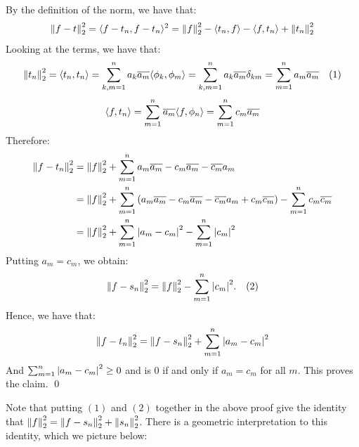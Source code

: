\begin{nproof}
    By the definition of the norm, we have that:
    \begin{align*}
        \norm{f - t}_2^2 = \langle f - t_n, f - t_n \rangle^2 = \norm{f}_2^2 - \langle t_n, f \rangle - \langle f, t_n \rangle + \norm{t_n}_2^2
    \end{align*}
    Looking at the terms, we have that:
    \begin{align*}
        \norm{t_n}_2^2 = \langle t_n, t_n \rangle = \sum_{k, m = 1}^n a_k\overline{a_m}\langle \phi_k, \phi_m \rangle = \sum_{k, m = 1}^n a_k\overline{a_m}\delta_{km} = \sum_{m=1}^n a_m\overline{a_m} \quad (1)
    \end{align*}
    \begin{align*}
        \langle f, t_n \rangle = \sum_{m=1}^n \overline{a_m}\langle f, \phi_n \rangle = \sum_{m=1}^n c_m\overline{a_m}
    \end{align*}
    Therefore:
    \begin{align*}
        \norm{f - t_n}_2^2 &= \norm{f}_2^2 + \sum_{m=1}^n a_m\overline{a_m} - c_m\overline{a_m} - \overline{c_m}a_m 
        \\ &= \norm{f}_2^2 + \sum_{m=1}^n \left(a_m\overline{a_m} - c_m\overline{a_m} - \overline{c_m}a_m + c_m\overline{c_m}\right) - \sum_{m=1}^n c_m\overline{c_m}
        \\ &= \norm{f}_2^2 + \sum_{m=1}^n \abs{a_m - c_m}^2 - \sum_{m=1}^n \abs{c_m}^2
    \end{align*}
    Putting $a_m = c_m$, we obtain:
    \begin{align*}
        \norm{f - s_n}_2^2 = \norm{f}_2^2 - \sum_{m=1}^n \abs{c_m}^2. \quad (2)
    \end{align*} Hence, we have that:
    \begin{align*}
        \norm{f - t_n}_2^2 = \norm{f - s_n}_2^2 + \sum_{m=1}^n \abs{a_m - c_m}^2
    \end{align*} 
    And $\sum_{m=1}^n \abs{a_m - c_m}^2 \geq 0$ and is $0$ if and only if $a_m = c_m$ for all $m$. This proves the claim. \qed
\end{nproof}
\noindent Note that putting $(1)$ and $(2)$ together in the above proof give the identity that $\norm{f}_2^2 = \norm{f - s_n}_2^2 + \norm{s_n}_2^2$. There is a geometric interpretation to this identity, which we picture below:

